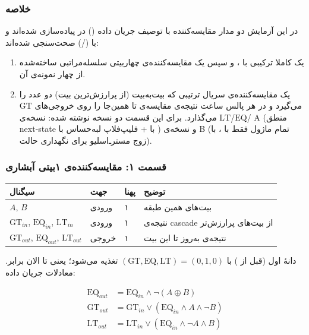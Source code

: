 \documentclass[10pt,a4paper]{article}
\begin{document}

\subsubsection*{خلاصه}

در این آزمایش دو مدار مقایسه‌کننده با توصیف {جریان داده} () در  پیاده‌سازی شده‌اند و با  (/) صحت‌سنجی شده‌اند:

\begin{enumerate}
  \item یک  کاملا ترکیبی با ، و سپس یک مقایسه‌کننده‌ی چهاربیتی سلسله‌مراتبی ساخته‌شده از چهار نمونه‌ی آن.
  \item یک مقایسه‌کننده‌ی {سریال} ترتیبی که بیت‌به‌بیت (از پرارزش‌ترین بیت) دو عدد را می‌گیرد و در هر پالس ساعت نتیجه‌ی مقایسه‌ی تا همین‌جا را روی خروجی‌های $\mathrm{GT}$/$\mathrm{EQ}$/$\mathrm{LT}$ می‌گذارد. برای این قسمت دو نسخه نوشته شده: نسخه‌ی {A} (منطق next-state با  + فلیپ‌فلاپ لبه‌حساس با ) و نسخه‌ی {B} (تمام ماژول فقط با ، با زوج  مسترـ‌اسلیو برای نگهداری حالت).
\end{enumerate}

\subsubsection*{قسمت ۱: مقایسه‌کننده‌ی ۱بیتی آبشاری}

\begin{center}
\begin{tabular}{@{}lll p{7.5cm}@{}}
\toprule
{سیگنال} & {جهت} & {پهنا} & {توضیح} \\
\midrule
$A$, $B$ & ورودی & ۱ & بیت‌های همین طبقه \\
$\mathrm{GT}_{in}$, $\mathrm{EQ}_{in}$, $\mathrm{LT}_{in}$ & ورودی & ۱ & نتیجه‌ی cascade از بیت‌های پرارزش‌تر \\
$\mathrm{GT}_{out}$, $\mathrm{EQ}_{out}$, $\mathrm{LT}_{out}$ & خروجی & ۱ & نتیجه‌ی به‌روز تا این بیت \\
\bottomrule
\end{tabular}
\end{center}

دانهٔ اول (قبل از ) با $(\mathrm{GT},\mathrm{EQ},\mathrm{LT})=(0,1,0)$ تغذیه می‌شود؛ یعنی تا الان برابر. معادلات جریان داده:

\[
\begin{aligned}
\mathrm{EQ}_{out} &= \mathrm{EQ}_{in} \land \lnot(A \oplus B)\\
\mathrm{GT}_{out} &= \mathrm{GT}_{in} \lor (\mathrm{EQ}_{in} \land A \land \lnot B)\\
\mathrm{LT}_{out} &= \mathrm{LT}_{in} \lor (\mathrm{EQ}_{in} \land \lnot A \land B)
\end{aligned}
\]
\end{document}
